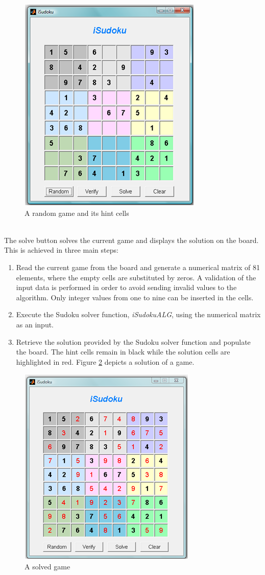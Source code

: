 \documentclass[12pt,a4paper]{article} %
\begin{document}
\begin{figure}[h!]
\centering
\includegraphics[scale = 1.4]{pictures/board2}
\caption{A random game and its hint cells}
\label{fig:board2}
\end{figure}
\newline
\\The solve button solves the current game and displays the solution on the board. This is achieved in three main steps:
\begin{enumerate}
\item Read the current game from the board and generate a numerical matrix of 81 elements, where the empty cells are substituted by zeros. A validation of the input data is performed in order to avoid sending invalid values to the algorithm. Only integer values from one to nine can be inserted in the cells. 
\item Execute the Sudoku solver function, \textit{iSudokuALG}, using the numerical matrix as an input.
\item Retrieve the solution provided by the Sudoku solver function and populate the board. The hint cells remain in black while the solution cells are highlighted in red. Figure \ref{fig:board3} depicts a solution of a game.
\end{enumerate}
\begin{figure}[h!]
\centering
\includegraphics[scale = 1.4]{pictures/board3}
\caption{A solved game}
\label{fig:board3}
\end{figure}
\end{document}
